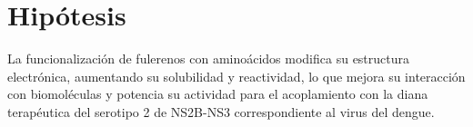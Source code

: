 \titleformat{\chapter}[display]
  {\normalfont\bfseries}{}{0pt}{\Large} %
\chapter{Hipótesis}
La funcionalización de fulerenos con aminoácidos modifica su estructura electrónica, aumentando su solubilidad y reactividad, lo que mejora su interacción con biomoléculas y potencia su actividad para el acoplamiento con la diana terapéutica del serotipo 2 de NS2B-NS3 correspondiente al virus del dengue.
